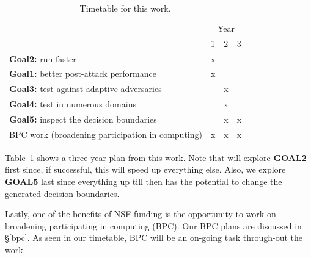  \begin{table}
{ \footnotesize
\begin{tabular}{|l|l|l|l|}\cline{2-4}    
\multicolumn{1}{c|}{~}      &\multicolumn{3}{c|}{Year} \\
\multicolumn{1}{l|}{~}       &1 & 2 & 3  \\\hline  
{\bf Goal2:} run faster                   &   x  &  &   \\\hline 
{\bf Goal1:} better post-attack performance         &    x  &       &   \\\hline 
{\bf Goal3:} test against adaptive adversaries        &      & x      &   \\\hline  
{\bf Goal4:}  test in numerous domains                &      & x     &       \\ \hline
{\bf Goal5:} inspect the decision boundaries           &      & x      &  x     \\ \hline
BPC work (broadening participation in computing)  &   x &  x    & x     \\ \hline
\end{tabular} } 
\caption{Timetable for this work. }\label{when}
\end{table}
Table~\ref{when} shows a three-year plan from this work.
Note that   will explore {\bf GOAL2} first since, if successful, this will speed up everything else.
Also,  we   explore {\bf GOAL5} last since everything up till
then has the potential to change the generated decision boundaries.

Lastly, 
one  of the benefits of  NSF funding
is the opportunity to work on  broadening participating in computing (BPC).  Our BPC plans are discussed in \S\ref{bpc}. As seen
  in our timetable, BPC will be an on-going task through-out the work.





 
